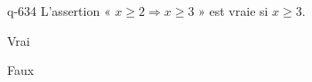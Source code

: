 \begin{truefalse}{q-634}
L'assertion « $x\geq 2 \Rightarrow x \geq 3$ » est vraie si $x\geq 3$.
\item* Vrai
\item Faux
\end{truefalse}

